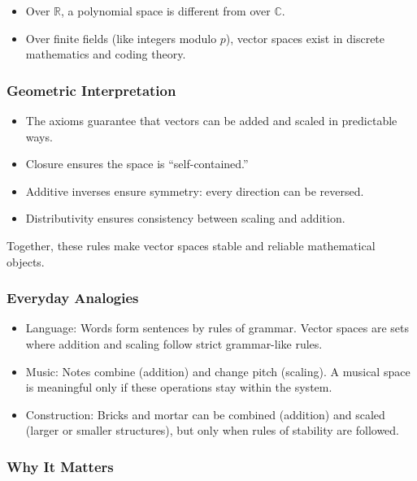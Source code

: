 \documentclass[
  letterpaper,
  DIV=11,
  numbers=noendperiod]{scrreprt}
\providecommand{\tightlist}{%
  \setlength{\itemsep}{0pt}\setlength{\parskip}{0pt}}
\begin{document}
\begin{itemize}
\tightlist
\item
  Over \(\mathbb{R}\), a polynomial space is different from over
  \(\mathbb{C}\).
\item
  Over finite fields (like integers modulo \(p\)), vector spaces exist
  in discrete mathematics and coding theory.
\end{itemize}

\subsubsection{Geometric
Interpretation}\label{geometric-interpretation-2}

\begin{itemize}
\tightlist
\item
  The axioms guarantee that vectors can be added and scaled in
  predictable ways.
\item
  Closure ensures the space is ``self-contained.''
\item
  Additive inverses ensure symmetry: every direction can be reversed.
\item
  Distributivity ensures consistency between scaling and addition.
\end{itemize}

Together, these rules make vector spaces stable and reliable
mathematical objects.

\subsubsection{Everyday Analogies}\label{everyday-analogies-27}

\begin{itemize}
\tightlist
\item
  Language: Words form sentences by rules of grammar. Vector spaces are
  sets where addition and scaling follow strict grammar-like rules.
\item
  Music: Notes combine (addition) and change pitch (scaling). A musical
  space is meaningful only if these operations stay within the system.
\item
  Construction: Bricks and mortar can be combined (addition) and scaled
  (larger or smaller structures), but only when rules of stability are
  followed.
\end{itemize}

\subsubsection{Why It Matters}\label{why-it-matters-27}
\end{document}
